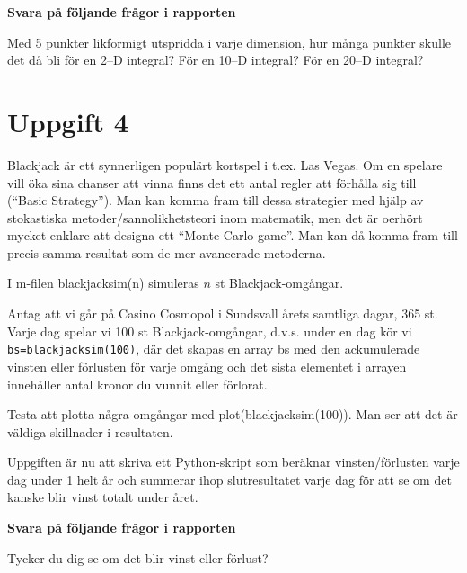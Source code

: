 \documentclass[a4paper]{article}
\begin{document}
\textbf{Svara på följande frågor i rapporten} 

Med 5 punkter likformigt utspridda i varje dimension, hur många punkter skulle
det då bli för en 2--D integral? För en 10--D integral? För en 20--D integral?

\newpage
\section{Uppgift 4}

Blackjack är ett synnerligen populärt kortspel i t.ex. Las Vegas. 
Om en spelare vill öka sina chanser att vinna finns det ett antal regler att
förhålla sig till (``Basic Strategy''). Man kan komma fram till dessa strategier
med hjälp av stokastiska metoder/sannolikhetsteori inom matematik, men det är oerhört 
mycket enklare att designa ett ``Monte Carlo game''. Man kan då komma fram till precis 
samma resultat som de mer avancerade metoderna.

I m-filen blackjacksim(n) simuleras \(n\) st Blackjack-omgångar.

Antag att vi går på Casino Cosmopol i Sundsvall årets samtliga dagar, 365 st. 
Varje dag spelar vi 100 st Blackjack-omgångar, d.v.s. under en dag kör vi \lstinline{bs=blackjacksim(100)},
där det skapas en array bs med den ackumulerade vinsten eller förlusten för varje omgång
och det sista elementet i arrayen innehåller antal kronor du vunnit eller förlorat.

Testa att plotta några omgångar med plot(blackjacksim(100)). Man ser att det är väldiga skillnader i resultaten.

Uppgiften är nu att skriva ett Python-skript som beräknar vinsten/förlusten varje dag under 1
helt år och summerar ihop slutresultatet varje dag för att se om det kanske blir vinst totalt under året.

\textbf{Svara på följande frågor i rapporten} 

Tycker du dig se om det blir vinst eller förlust?
\end{document}
